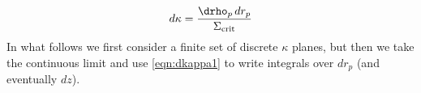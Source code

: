 \begin{equation}
\label{eqn:dkappa1}
  d\kappa = \frac{\drho_p\,dr_p}{\Sigma_{\rm crit}}
 \end{equation}
In what follows we first consider a finite set of discrete $\kappa$ planes, but then we take the continuous limit and use \ref{eqn:dkappa1} to write integrals over $dr_p$ (and eventually $dz$).
  